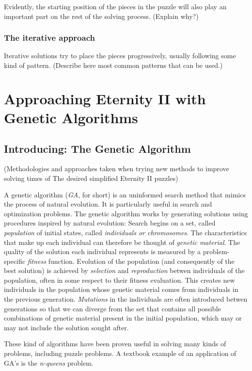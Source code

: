 \documentclass{llncs}
\begin{document}
Evidently, the starting position of the pieces in the puzzle will also play an important part on the rest of the solving process. (Explain why?)

\subsubsection{The iterative approach}\label{sec:iterative_approach}

Iterative solutions try to place the pieces progressively, usually following some kind of pattern.
(Describe here most common patterns that can be used.)

\section{Approaching Eternity II with Genetic Algorithms}\label{sec:genetic_algorithms}

\subsection{Introducing: The Genetic Algorithm}
(Methodologies and approaches taken when trying new methods to improve solving times of The desired simplified Eternity II puzzles)

A genetic algorithm (\textit{GA}, for short) is an uninformed search method that mimics the process of natural evolution. It is particularly useful in search and optimization problems. The genetic algorithm works by generating solutions using procedures inspired by natural evolution: Search begins on a set, called \textit{population} of initial states, called \textit{individuals or chromosomes}. The characteristics that make up each individual can therefore be thought of \textit{genetic material}. The quality of the solution each individual represents is measured by a problem-specific \textit{fitness} function. Evolution of the population (and consequently of the best solution) is achieved by \textit{selection} and \textit{reproduction} betwen individuals of the population, often in some respect to their fitness evaluation. This creates new individuals in the population whose genetic material comes from individuals in the previous generation.
\textit{Mutations} in the individuals are often introduced betwen generations so that we can diverge from the set that contains all possible combinations of genetic material present in the initial population, which may or may not include the solution sought after.

These kind of algorithms have been proven useful in solving many kinds of problems, including puzzle problems. A textbook example of an application of GA's is the \textit{n-queens} problem\cite{eastridge}.
\end{document}
